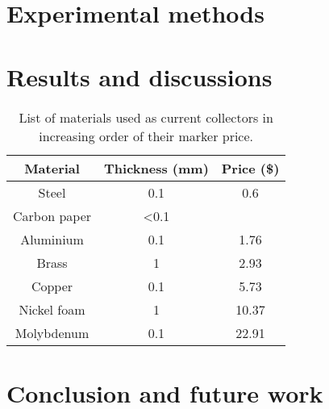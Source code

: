 \section{Experimental methods}
\section{Results and discussions}

\begin{table}
\caption{List of materials used as current collectors in increasing order of their marker price.} \label{t1}
\begin{center}
 \begin{tabular}{|ccc|} 
 \hline
 \textbf{Material} & \textbf{Thickness (mm)} & \textbf{Price (\$)} \\
 \hline
Steel & 0.1 & 0.6 \\ 
Carbon paper  & <0.1 &  \\
Aluminium & 0.1 & 1.76 \\
Brass & 1 & 2.93 \\
Copper & 0.1 & 5.73 \\ 
Nickel foam & 1 & 10.37 \\
Molybdenum & 0.1 & 22.91 \\
 \hline
\end{tabular}
\end{center}
\end{table}

\section{Conclusion and future work}